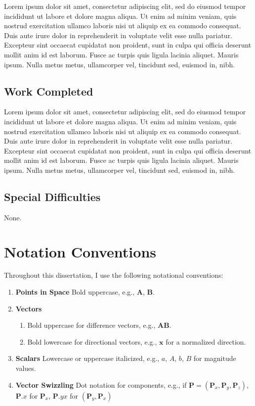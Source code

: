 \documentclass[12pt,a4paper,twoside,openright]{report}
\begin{document}
Lorem ipsum dolor sit amet, consectetur adipiscing elit, sed do eiusmod tempor incididunt ut labore et dolore magna aliqua. Ut enim ad minim veniam, quis nostrud exercitation ullamco laboris nisi ut aliquip ex ea commodo consequat. Duis aute irure dolor in reprehenderit in voluptate velit esse nulla pariatur. Excepteur sint occaecat cupidatat non proident, sunt in culpa qui officia deserunt mollit anim id est laborum.
Fusce ac turpis quis ligula lacinia aliquet. Mauris ipsum. Nulla metus metus, ullamcorper vel, tincidunt sed, euismod in, nibh.

\section*{Work Completed}

Lorem ipsum dolor sit amet, consectetur adipiscing elit, sed do eiusmod tempor incididunt ut labore et dolore magna aliqua. Ut enim ad minim veniam, quis nostrud exercitation ullamco laboris nisi ut aliquip ex ea commodo consequat. Duis aute irure dolor in reprehenderit in voluptate velit esse nulla pariatur. Excepteur sint occaecat cupidatat non proident, sunt in culpa qui officia deserunt mollit anim id est laborum.
Fusce ac turpis quis ligula lacinia aliquet. Mauris ipsum. Nulla metus metus, ullamcorper vel, tincidunt sed, euismod in, nibh.

\section*{Special Difficulties}

None.

\newpage 

\chapter*{Notation Conventions}

Throughout this dissertation, I use the following notational conventions:

\begin{enumerate}
    \item \textbf{Points in Space} Bold uppercase, e.g., $\mathbf{A}$, $\mathbf{B}$.
    \item \textbf{Vectors} 
        \begin{enumerate}
	\item Bold uppercase for difference vectors, e.g., $\mathbf{AB}$.
	\item Bold lowercase for directional vectors, e.g., $\mathbf{x}$ for a normalized direction.
        \end{enumerate}
    \item \textbf{Scalars} Lowercase or uppercase italicized, e.g., $a$, $A$, $b$, $B$ for magnitude values.
    \item \textbf{Vector Swizzling} Dot notation for components, e.g., if $\mathbf{P}=(\mathbf{P}_x,\mathbf{P}_y,\mathbf{P}_z)$, $\mathbf{P}.x$ for $\mathbf{P}_x$, $\mathbf{P}.yx$ for $(\mathbf{P}_{y}, \mathbf{P}_x)$
\end{enumerate}
\end{document}
